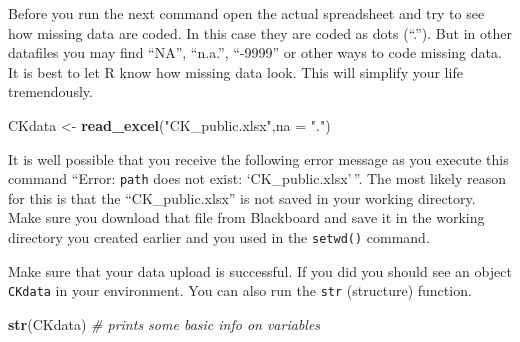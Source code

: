 \documentclass[
]{article}
\newenvironment{Shaded}{\begin{snugshade}}{\end{snugshade}}
\newcommand{\AttributeTok}[1]{\textcolor[rgb]{0.13,0.29,0.53}{#1}}
\newcommand{\CommentTok}[1]{\textcolor[rgb]{0.56,0.35,0.01}{\textit{#1}}}
\newcommand{\FunctionTok}[1]{\textcolor[rgb]{0.13,0.29,0.53}{\textbf{#1}}}
\newcommand{\NormalTok}[1]{#1}
\newcommand{\OtherTok}[1]{\textcolor[rgb]{0.56,0.35,0.01}{#1}}
\newcommand{\StringTok}[1]{\textcolor[rgb]{0.31,0.60,0.02}{#1}}
\begin{document}
Before you run the next command open the actual spreadsheet and try to
see how missing data are coded. In this case they are coded as dots
(``.''). But in other datafiles you may find ``NA'', ``n.a.'', ``-9999''
or other ways to code missing data. It is best to let R know how missing
data look. This will simplify your life tremendously.

\begin{Shaded}
\begin{Highlighting}[]
\NormalTok{CKdata }\OtherTok{\textless{}{-}} \FunctionTok{read\_excel}\NormalTok{(}\StringTok{"CK\_public.xlsx"}\NormalTok{,}\AttributeTok{na =} \StringTok{"."}\NormalTok{)}
\end{Highlighting}
\end{Shaded}

It is well possible that you receive the following error message as you
execute this command ``Error: \texttt{path} does not exist:
`CK\_public.xlsx'\,''. The most likely reason for this is that the
``CK\_public.xlsx'' is not saved in your working directory. Make sure
you download that file from Blackboard and save it in the working
directory you created earlier and you used in the \texttt{setwd()}
command.

Make sure that your data upload is successful. If you did you should see
an object \texttt{CKdata} in your environment. You can also run the
\texttt{str} (structure) function.

\begin{Shaded}
\begin{Highlighting}[]
\FunctionTok{str}\NormalTok{(CKdata)  }\CommentTok{\# prints some basic info on variables}
\end{Highlighting}
\end{Shaded}
\end{document}
